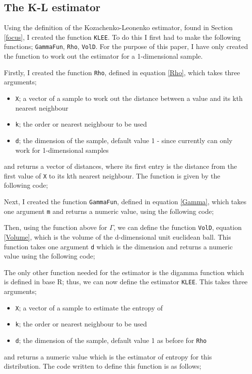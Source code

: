 \documentclass[12pt]{report}
\begin{document}
\begin{appendix}
\section{The K-L estimator}

Using the definition of the Kozachenko-Leonenko estimator, found in Section \ref{focus}, I created the function \texttt{KLEE}. To do this I first had to make the following functions; \texttt{GammaFun}, \texttt{Rho}, \texttt{VolD}. For the purpose of this paper, I have only created the function to work out the estimator for a 1-dimensional sample.

Firstly, I created the function \texttt{Rho}, defined in equation \ref{Rho}, which takes three arguments;
\begin{itemize}
\item \texttt{X}; a vector of a sample to work out the distance between a value and its kth nearest neighbour
\item \texttt{k}; the order or nearest neighbour to be used
\item \texttt{d}; the dimension of the sample, default value 1 - since currently can only work for 1-dimensional samples
\end{itemize}
and returns a vector of distances, where its first entry is the distance from the first value of \texttt{X} to its kth nearest neighbour. The function is given by the following code;


Next, I created the function \texttt{GammaFun}, defined in equation \ref{Gamma}, which takes one argument \texttt{m} and returns a numeric value, using the following code;


Then, using the function above for $\Gamma$, we can define the function \texttt{VolD}, equation \ref{Volume}, which is the volume of the d-dimensional unit euclidean ball. This function takes one argument \texttt{d} which is the dimension and returns a numeric value using the following code;


The only other function needed for the estimator is the digamma function which is defined in base R; thus, we can now define the estimator \texttt{KLEE}. This takes three arguments;
\begin{itemize}
\item \texttt{X}; a vector of a sample to estimate the entropy of
\item \texttt{k}; the order or nearest neighbour to be used
\item \texttt{d}; the dimension of the sample, default value 1 as before for \texttt{Rho}
\end{itemize}
and returns a numeric value which is the estimator of entropy for this distribution. The code written to define this function is as follows;




\end{appendix}
\end{document}
